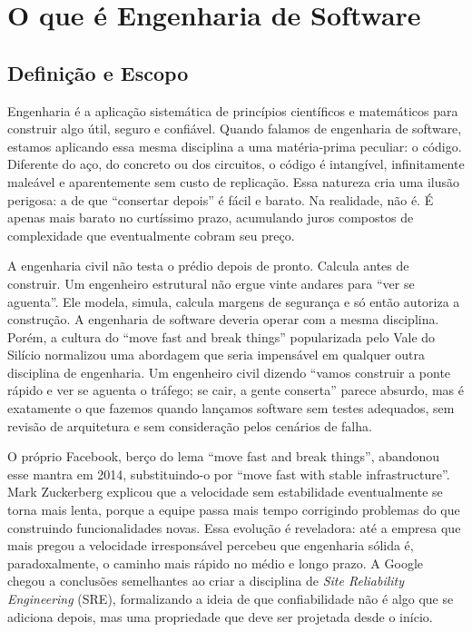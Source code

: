 \section{O que é Engenharia de Software}

\subsection{Definição e Escopo}

Engenharia é a aplicação sistemática de princípios científicos e
matemáticos para construir algo útil, seguro e confiável. Quando falamos
de engenharia de software, estamos aplicando essa mesma disciplina a uma
matéria-prima peculiar: o código. Diferente do aço, do concreto ou dos
circuitos, o código é intangível, infinitamente maleável e aparentemente
sem custo de replicação. Essa natureza cria uma ilusão perigosa: a de
que ``consertar depois'' é fácil e barato. Na realidade, não é. É apenas
mais barato no curtíssimo prazo, acumulando juros compostos de
complexidade que eventualmente cobram seu preço.

A engenharia civil não testa o prédio depois de pronto. Calcula antes
de construir. Um engenheiro estrutural não ergue vinte andares para ``ver
se aguenta''. Ele modela, simula, calcula margens de segurança e só então
autoriza a construção. A engenharia de software deveria operar com a mesma
disciplina. Porém, a cultura do ``move fast and break things''
popularizada pelo Vale do Silício normalizou uma abordagem que seria
impensável em qualquer outra disciplina de engenharia. Um engenheiro civil
dizendo ``vamos construir a ponte rápido e ver se aguenta o tráfego; se
cair, a gente conserta'' parece absurdo, mas é exatamente o que fazemos
quando lançamos software sem testes adequados, sem revisão de arquitetura
e sem consideração pelos cenários de falha.

O próprio Facebook, berço do lema ``move fast and break things'',
abandonou esse mantra em 2014, substituindo-o por ``move fast with stable
infrastructure''. Mark Zuckerberg explicou que a velocidade sem
estabilidade eventualmente se torna mais lenta, porque a equipe passa
mais tempo corrigindo problemas do que construindo funcionalidades novas.
Essa evolução é reveladora: até a empresa que mais pregou a velocidade
irresponsável percebeu que engenharia sólida é, paradoxalmente, o caminho
mais rápido no médio e longo prazo. A Google chegou a conclusões
semelhantes ao criar a disciplina de \emph{Site Reliability Engineering}
(SRE), formalizando a ideia de que confiabilidade não é algo que se
adiciona depois, mas uma propriedade que deve ser projetada desde o início.

